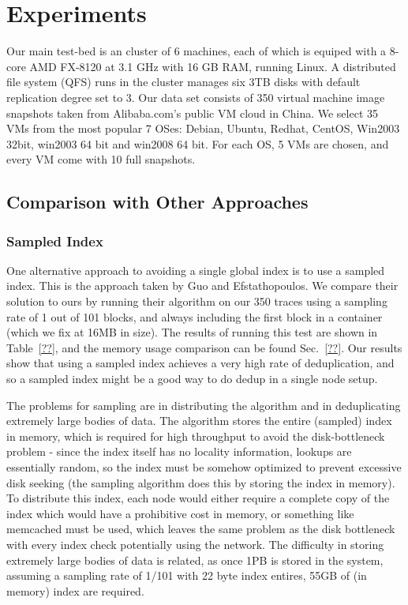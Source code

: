 \section{Experiments}
Our main test-bed is an cluster of 6 machines,
each of which is equiped with a 8-core AMD FX-8120 at 3.1 GHz
with 16 GB RAM, running Linux.
A distributed file system (QFS) runs in the cluster manages six 3TB disks
 with default replication degree set to 3.
Our data set consists of 350 virtual machine image snapshots taken from Alibaba.com's
public VM cloud in China. We select 35 VMs from the most popular 7 OSes: 
Debian, Ubuntu, Redhat, CentOS, Win2003 32bit, win2003 64 bit and win2008 64 bit. 
For each OS, 5 VMs are chosen, and every VM come with 10 full snapshots.

\subsection{Comparison with Other Approaches}
\subsubsection{Sampled Index}
One alternative approach to avoiding a single global index is to use a sampled
index. This is the approach taken by Guo and Efstathopoulos\cite{Guo2011}. We
compare their solution to ours by running their algorithm on our 350 traces
using a sampling rate of 1 out of 101 blocks, and always including the first
block in a container (which we fix at 16MB in size). The results of running this
test are shown in Table~\ref{??}, and the memory usage comparison can be found
Sec.~\ref{??}. Our results show that using a sampled index achieves a very high
rate of deduplication, and so a sampled index might be a good way to do dedup
in a single node setup.

The problems for sampling are in distributing the
algorithm and in deduplicating extremely large bodies of data. The algorithm
stores the entire (sampled) index in memory, which is required for high
throughput to avoid the disk-bottleneck problem - since the index itself has no
locality information, lookups are essentially random, so the index must be
somehow optimized to prevent excessive disk seeking (the sampling algorithm does
this by storing the index in memory). To distribute this index, each node would
either require a complete copy of the index which would have a prohibitive cost in
memory, or something like memcached must be used, which leaves the same problem
as the disk bottleneck with every index check potentially using the network.
The difficulty in storing extremely large bodies of data
is related, as once 1PB is stored in the system, assuming a sampling rate of 
1/101 with 22 byte index entires, 55GB of (in memory) index are required.

